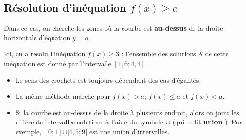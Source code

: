 \documentclass{poly}
\begin{document}
\subsection{Résolution d'inéquation $f(x) \geq a$}
Dans ce cas, on cherche les zones où la courbe est \textbf{au-dessus} de la droite horizontale d'équation $y = a$.
\begin{example}
\hfill
\begin{center}
\end{center}
Ici, on a résolu l'inéquation $f(x) \geq 3$ : l'ensemble des solutions $\mathcal{S}$ de cette inéquation est donné par l'intervalle $[1,6;4,4]$.
\end{example}
\begin{tcolorbox}
\begin{remark}
\hfill
\begin{itemize}
\item Le sens des crochets est toujours dépendant des cas d'égalités.
\item La même méthode marche pour $f(x) > a$; $f(x) \leq a$ et $f(x) < a$.
\item Si la courbe est au-dessus de la droite à plusieurs endroit, alors on \og joint \fg les différents intervalles-solutions à l'aide du symbole $\cup$ (qui se lit \textbf{\og union \fg}). Par exemple, $[0;1] \cup ]4,5;9]$ est une union d'intervalles.
\end{itemize}
\end{remark}
\end{tcolorbox}

\newpage
\end{document}
